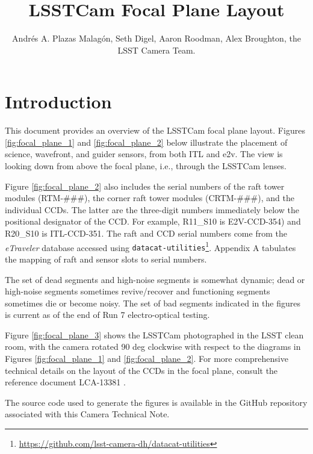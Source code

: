 \documentclass[OPS,authoryear,toc]{lsstdoc}
\title{LSSTCam Focal Plane Layout}
\author{%
Andrés A. Plazas Malagón, Seth Digel, Aaron Roodman, Alex Broughton, the LSST Camera Team. 
}
\date{\vcsDate}
\begin{document}
\maketitle


\section{Introduction}
This document provides an overview of the LSSTCam focal plane layout.
Figures \ref{fig:focal_plane_1} and \ref{fig:focal_plane_2} below illustrate the placement of science, wavefront, and guider sensors, from both ITL and e2v.
The view is looking down from above the focal plane, i.e., through the LSSTCam lenses.

Figure \ref{fig:focal_plane_2} also includes the serial numbers of the raft tower modules (RTM-\#\#\#), the corner raft tower modules (CRTM-\#\#\#), and the individual CCDs.
The latter are the three-digit numbers immediately below the positional designator of the CCD.
For example, R11\_S10 is E2V-CCD-354) and R20\_S10 is ITL-CCD-351.
The raft and CCD serial numbers come from the \emph{eTraveler} database accessed using {\tt{datacat-utilities}}\footnote{\url{https://github.com/lsst-camera-dh/datacat-utilities}}.
Appendix A tabulates the mapping of raft and sensor slots to serial numbers.

The set of dead segments and high-noise segments is somewhat dynamic; dead or high-noise segments sometimes revive/recover and functioning segments sometimes die or become noisy.
The set of bad segments indicated in the figures is current as of the end of Run 7 electro-optical testing.

Figure \ref{fig:focal_plane_3} shows the LSSTCam photographed in the LSST clean room, with the camera rotated 90 deg clockwise with respect to the diagrams in Figures \ref{fig:focal_plane_1} and \ref{fig:focal_plane_2}.
For more comprehensive technical details on the layout of the CCDs in the focal plane, consult the reference document LCA-13381 \citep{lca13381}. 

The source code used to generate the figures is available in the GitHub repository associated with this Camera Technical Note.
\end{document}
